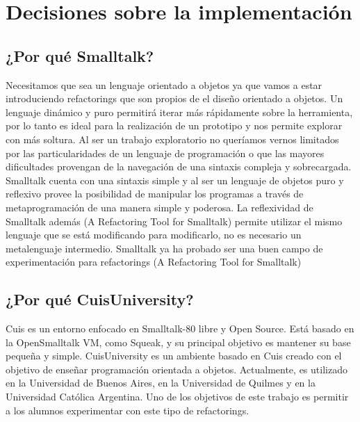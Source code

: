 \section{Decisiones sobre la implementación}

\subsection*{¿Por qué Smalltalk?}
Necesitamos que sea un lenguaje orientado a objetos ya que vamos a estar
introduciendo refactorings que son propios de el diseño orientado a objetos. Un
lenguaje dinámico y puro permitirá iterar más rápidamente sobre la herramienta,
por lo tanto es ideal para la realización de un prototipo y nos permite explorar
con más soltura. Al ser un trabajo exploratorio no queríamos vernos limitados
por las particularidades de un lenguaje de programación o que las mayores
dificultades provengan de la navegación de una sintaxis compleja y
sobrecargada. Smalltalk cuenta con una sintaxis simple y al ser un lenguaje de
objetos puro y reflexivo provee la posibilidad de manipular los programas a
través de metaprogramación de una manera simple y poderosa. La reflexividad de
Smalltalk además (A Refactoring Tool for Smalltalk) permite utilizar el mismo
lenguaje que se está modificando para modificarlo, no es necesario un
metalenguaje intermedio.
Smalltalk ya ha probado ser una buen campo de experimentación para refactorings
(A Refactoring Tool for Smalltalk)


\subsection*{¿Por qué CuisUniversity?}
Cuis es un entorno enfocado en Smalltalk-80 libre y Open Source. Está basado en
la OpenSmalltalk
VM, como Squeak, y su principal objetivo es mantener su base pequeña y
simple. CuisUniversity es un ambiente basado en Cuis creado con el objetivo de
enseñar programación orientada a objetos.  Actualmente, es utilizado en la
Universidad de Buenos Aires, en la Universidad de Quilmes y en la Universidad
Católica Argentina. Uno de los objetivos de este trabajo es permitir a los
alumnos experimentar con este tipo de refactorings.


